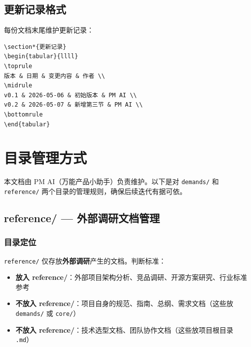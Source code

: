 \documentclass[11pt,a4paper]{article}
\begin{document}
\subsection{更新记录格式}

每份文档末尾维护更新记录：

\begin{lstlisting}[basicstyle=\ttfamily\footnotesize, frame=single]
\section*{更新记录}
\begin{tabular}{llll}
\toprule
版本 & 日期 & 变更内容 & 作者 \\
\midrule
v0.1 & 2026-05-06 & 初始版本 & PM AI \\
v0.2 & 2026-05-07 & 新增第三节 & PM AI \\
\bottomrule
\end{tabular}
\end{lstlisting}

\section{目录管理方式}

本文档由 PM AI（万能产品小助手）负责维护。以下是对 \texttt{demands/} 和 \texttt{reference/} 两个目录的管理规则，确保后续迭代有据可依。

\subsection{reference/ --- 外部调研文档管理}

\subsubsection{目录定位}

\texttt{reference/} 仅存放\textbf{外部调研}产生的文档。判断标准：

\begin{itemize}[nosep]
  \item \textbf{放入 reference/}：外部项目架构分析、竞品调研、开源方案研究、行业标准参考
  \item \textbf{不放入 reference/}：项目自身的规范、指南、总纲、需求文档（这些放 \texttt{demands/} 或 \texttt{core/}）
  \item \textbf{不放入 reference/}：技术选型文档、团队协作文档（这些放项目根目录 \texttt{.md}）
\end{itemize}
\end{document}
